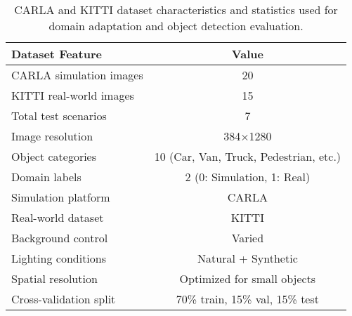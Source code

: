 \documentclass[conference]{IEEEtran}
\begin{document}
\begin{table}[!ht]
\centering
\caption{CARLA and KITTI dataset characteristics and statistics used for domain adaptation and object detection evaluation.}
\label{tab:Dataset} 
\begin{tabular}{|l|c|}
\hline
\textbf{Dataset Feature} & \textbf{Value} \\
\hline
CARLA simulation images & 20 \\
KITTI real-world images & 15 \\
Total test scenarios & 7 \\
Image resolution & 384×1280 \\
Object categories & 10 (Car, Van, Truck, Pedestrian, etc.) \\
Domain labels & 2 (0: Simulation, 1: Real) \\
Simulation platform & CARLA \\
Real-world dataset & KITTI \\
Background control & Varied \\
Lighting conditions & Natural + Synthetic \\
Spatial resolution & Optimized for small objects \\
Cross-validation split & 70\% train, 15\% val, 15\% test \\
\hline
\end{tabular}
\end{table}
\end{document}
